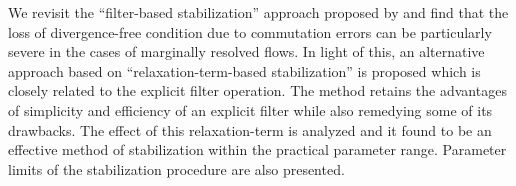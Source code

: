 \begin{paper}

\makepapertitle

%
\begin{paperabstract}
	We revisit the ``filter-based stabilization'' approach proposed by \cite{fischer01} and find that the loss of divergence-free condition due to commutation errors can be particularly severe in the cases of marginally resolved flows. In light of this, an alternative approach based on ``relaxation-term-based stabilization'' is proposed which is closely related to the explicit filter operation. The method retains the advantages of simplicity and efficiency of an explicit filter while also remedying some of its drawbacks. The effect of this relaxation-term is analyzed and it found to be an effective method of stabilization within the practical parameter range. Parameter limits of the stabilization procedure are also presented.
\end{paperabstract}


%



%


%

\end{paper}
